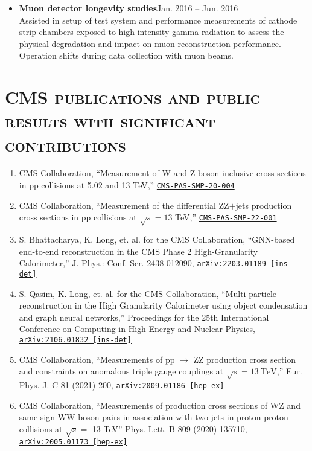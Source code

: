 \documentclass[10pt]{res} %
\begin{document}
\begin{resume}
\begin{itemize}
  \item\textbf{Muon detector longevity studies}\hfill{Jan. 2016 -- Jun. 2016} \\
    Assisted in setup of test system and performance measurements of cathode strip chambers
    exposed to high-intensity gamma radiation to assess the physical degradation and impact on muon
    reconstruction performance. Operation shifts during data collection with muon beams.

\end{itemize}

\section{\textsc{CMS publications and public results with significant contributions}}
\begin{enumerate}[itemindent=1mm,labelsep=1mm]
  \item CMS Collaboration, ``Measurement of W and Z boson inclusive cross sections in pp collisions at 5.02 and 13 TeV,'' \href{https://cds.cern.ch/record/2868090}{\texttt{CMS-PAS-SMP-20-004}} 
  \item CMS Collaboration, ``Measurement of the differential ZZ$+$jets production cross sections in pp collisions at $\sqrt{s} = 13$ TeV,'' \href{https://cds.cern.ch/record/2859350}{\texttt{CMS-PAS-SMP-22-001}} 
  \item S. Bhattacharya, K. Long, et. al. for the CMS Collaboration, ``GNN-based end-to-end reconstruction in the CMS Phase 2 High-Granularity Calorimeter,'' J. Phys.: Conf. Ser. 2438 012090, \href{https://arxiv.org/abs/2203.01189}{\texttt{arXiv:2203.01189 [ins-det]}} 
  \item S. Qasim, K. Long, et. al. for the CMS Collaboration, ``Multi-particle reconstruction in the High Granularity Calorimeter using object condensation and graph neural networks,'' Proceedings for the 25th International Conference on Computing in High-Energy and Nuclear Physics, \href{https://arxiv.org/abs/2106.01832}{\texttt{arXiv:2106.01832 [ins-det]}} 
  \item CMS Collaboration, ``Measurements of pp $\rightarrow$ ZZ production cross section and constraints on anomalous triple gauge couplings at $\sqrt{s} = 13~\mathrm{TeV}$,'' Eur. Phys. J. C 81 (2021) 200, \href{https://arxiv.org/abs/2009.01186}{\texttt{arXiv:2009.01186 [hep-ex]}}
  \item CMS Collaboration, ``Measurements of production cross sections of WZ and same-sign WW boson pairs in association with two jets in proton-proton collisions at $\sqrt{s} =$ 13 TeV'' Phys. Lett. B 809 (2020) 135710, \href{https://arxiv.org/abs/2005.01173}{\texttt{arXiv:2005.01173 [hep-ex]}}

\end{enumerate}
\end{resume}
\end{document}
